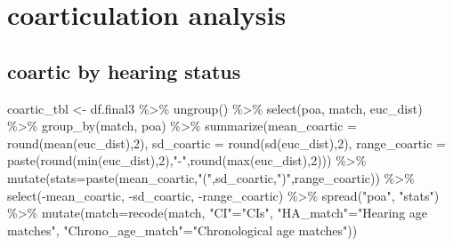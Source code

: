 \documentclass[
]{article}
\newenvironment{Shaded}{\begin{snugshade}}{\end{snugshade}}
\newcommand{\AttributeTok}[1]{\textcolor[rgb]{0.77,0.63,0.00}{#1}}
\newcommand{\DecValTok}[1]{\textcolor[rgb]{0.00,0.00,0.81}{#1}}
\newcommand{\FunctionTok}[1]{\textcolor[rgb]{0.00,0.00,0.00}{#1}}
\newcommand{\NormalTok}[1]{#1}
\newcommand{\OtherTok}[1]{\textcolor[rgb]{0.56,0.35,0.01}{#1}}
\newcommand{\SpecialCharTok}[1]{\textcolor[rgb]{0.00,0.00,0.00}{#1}}
\newcommand{\StringTok}[1]{\textcolor[rgb]{0.31,0.60,0.02}{#1}}
\begin{document}
\hypertarget{coarticulation-analysis}{%
\section{coarticulation analysis}\label{coarticulation-analysis}}

\hypertarget{coartic-by-hearing-status}{%
\subsection{coartic by hearing status}\label{coartic-by-hearing-status}}

\begin{Shaded}
\begin{Highlighting}[]
\NormalTok{coartic\_tbl }\OtherTok{\textless{}{-}}\NormalTok{ df.final3 }\SpecialCharTok{\%\textgreater{}\%}
  \FunctionTok{ungroup}\NormalTok{() }\SpecialCharTok{\%\textgreater{}\%}
  \FunctionTok{select}\NormalTok{(poa, match, euc\_dist) }\SpecialCharTok{\%\textgreater{}\%}
  \FunctionTok{group\_by}\NormalTok{(match, poa) }\SpecialCharTok{\%\textgreater{}\%}
  \FunctionTok{summarize}\NormalTok{(}\AttributeTok{mean\_coartic =} \FunctionTok{round}\NormalTok{(}\FunctionTok{mean}\NormalTok{(euc\_dist),}\DecValTok{2}\NormalTok{),}
            \AttributeTok{sd\_coartic =} \FunctionTok{round}\NormalTok{(}\FunctionTok{sd}\NormalTok{(euc\_dist),}\DecValTok{2}\NormalTok{),}
            \AttributeTok{range\_coartic =} \FunctionTok{paste}\NormalTok{(}\FunctionTok{round}\NormalTok{(}\FunctionTok{min}\NormalTok{(euc\_dist),}\DecValTok{2}\NormalTok{),}\StringTok{"{-}"}\NormalTok{,}\FunctionTok{round}\NormalTok{(}\FunctionTok{max}\NormalTok{(euc\_dist),}\DecValTok{2}\NormalTok{))) }\SpecialCharTok{\%\textgreater{}\%}
  \FunctionTok{mutate}\NormalTok{(}\AttributeTok{stats=}\FunctionTok{paste}\NormalTok{(mean\_coartic,}\StringTok{"("}\NormalTok{,sd\_coartic,}\StringTok{")"}\NormalTok{,range\_coartic)) }\SpecialCharTok{\%\textgreater{}\%}
  \FunctionTok{select}\NormalTok{(}\SpecialCharTok{{-}}\NormalTok{mean\_coartic, }\SpecialCharTok{{-}}\NormalTok{sd\_coartic, }\SpecialCharTok{{-}}\NormalTok{range\_coartic) }\SpecialCharTok{\%\textgreater{}\%}
  \FunctionTok{spread}\NormalTok{(}\StringTok{"poa"}\NormalTok{, }\StringTok{"stats"}\NormalTok{) }\SpecialCharTok{\%\textgreater{}\%}
  \FunctionTok{mutate}\NormalTok{(}\AttributeTok{match=}\FunctionTok{recode}\NormalTok{(match, }\StringTok{"CI"}\OtherTok{=}\StringTok{"CIs"}\NormalTok{, }\StringTok{"HA\_match"}\OtherTok{=}\StringTok{"Hearing age matches"}\NormalTok{, }\StringTok{"Chrono\_age\_match"}\OtherTok{=}\StringTok{"Chronological age matches"}\NormalTok{))}
\end{Highlighting}
\end{Shaded}
\end{document}
